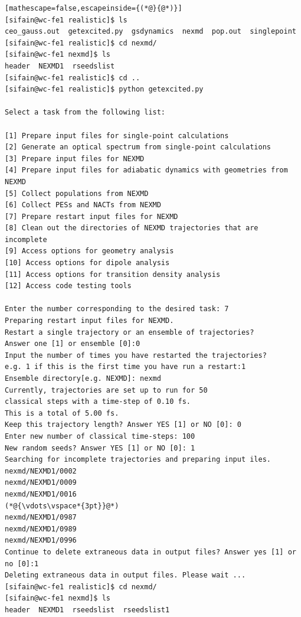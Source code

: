 \documentclass[letterpaper,12pt,titlepage]{article}
\begin{document}
\begin{lstlisting}[mathescape=false,escapeinside={(*@}{@*)}]
[sifain@wc-fe1 realistic]$ ls
ceo_gauss.out  getexcited.py  gsdynamics  nexmd  pop.out  singlepoint
[sifain@wc-fe1 realistic]$ cd nexmd/
[sifain@wc-fe1 nexmd]$ ls
header  NEXMD1  rseedslist
[sifain@wc-fe1 realistic]$ cd ..
[sifain@wc-fe1 realistic]$ python getexcited.py 

Select a task from the following list:

[1] Prepare input files for single-point calculations
[2] Generate an optical spectrum from single-point calculations
[3] Prepare input files for NEXMD
[4] Prepare input files for adiabatic dynamics with geometries from NEXMD
[5] Collect populations from NEXMD
[6] Collect PESs and NACTs from NEXMD
[7] Prepare restart input files for NEXMD
[8] Clean out the directories of NEXMD trajectories that are incomplete
[9] Access options for geometry analysis
[10] Access options for dipole analysis
[11] Access options for transition density analysis
[12] Access code testing tools

Enter the number corresponding to the desired task: 7
Preparing restart input files for NEXMD.
Restart a single trajectory or an ensemble of trajectories?
Answer one [1] or ensemble [0]:0
Input the number of times you have restarted the trajectories?
e.g. 1 if this is the first time you have run a restart:1
Ensemble directory[e.g. NEXMD]: nexmd 
Currently, trajectories are set up to run for 50 
classical steps with a time-step of 0.10 fs.
This is a total of 5.00 fs.
Keep this trajectory length? Answer YES [1] or NO [0]: 0
Enter new number of classical time-steps: 100
New random seeds? Answer YES [1] or NO [0]: 1
Searching for incomplete trajectories and preparing input iles.
nexmd/NEXMD1/0002
nexmd/NEXMD1/0009
nexmd/NEXMD1/0016
(*@{\vdots\vspace*{3pt}}@*)
nexmd/NEXMD1/0987
nexmd/NEXMD1/0989
nexmd/NEXMD1/0996
Continue to delete extraneous data in output files? Answer yes [1] or no [0]:1
Deleting extraneous data in output files. Please wait ...
[sifain@wc-fe1 realistic]$ cd nexmd/
[sifain@wc-fe1 nexmd]$ ls
header  NEXMD1  rseedslist  rseedslist1
\end{lstlisting}
\end{document}
